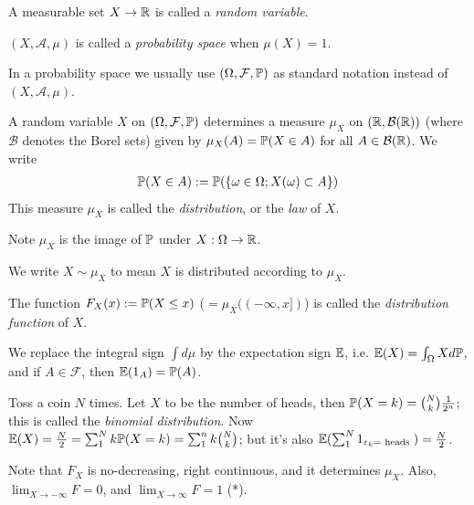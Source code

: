 \documentclass[a4paper]{article}
\begin{document}
\begin{defi}
A measurable set $X \to \R$ is called a \emph{random variable}.
\end{defi}

\begin{defi}
$(X,\mathcal{A},\mu)$ is called a \emph{probability space} when $\mu(X) = 1$.

In a probability space we usually use $(\Omega,\mathcal{F},\P)$ as standard notation instead of $(X,\mathcal{A},\mu)$.
\end{defi}

\begin{defi}
A random variable $X$ on $(\Omega,\mathcal{F},\P)$ determines a measure $\mu_X$ on $(\R,\mathcal{B}(\R))$ (where $\mathcal{B}$ denotes the Borel sets) given by $\mu_X(A) = \P(X \in A)$ for all $A \in \mathcal{B}(\R)$. We write
\begin{equation*}
\begin{aligned}
\P(X \in A): = \P(\{\omega \in \Omega; X(\omega) \subset A\})
\end{aligned}
\end{equation*}
This measure $\mu_X$ is called the \emph{distribution}, or the \emph{law} of $X$.

Note $\mu_X$ is the image of $\P$ under $X: \Omega \to \R$.
\end{defi}

We write $X \sim \mu_X$ to mean $X$ is distributed according to $\mu_X$.

\begin{defi}
The function $F_X(x) := \P(X \leq x)$ ($ = \mu_X((-\infty,x])$) is called the \emph{distribution function} of $X$.
\end{defi}

We replace the integral sign $\int d\mu$ by the expectation sign $\E$, i.e. $\E(X) = \int_\Omega X d\P$, and if $A \in \mathcal{F}$, then $\E(1_A) = \P(A)$.

\begin{eg}
Toss a coin $N$ times. Let $X$ to be the number of heads, then $\P(X=k) = {N \choose k} \frac{1}{2^n}$; this is called the \emph{binomial distribution}. Now $\E(X) = \frac{N}{2} = \sum_1^N k\P(X=k) = \sum_1^n k{N \choose k}$; but it's also $\E(\sum_1^N 1_{\varepsilon_k = \text{ heads }}) = \frac{N}{2}$.
\end{eg}

Note that $F_X$ is no-decreasing, right continuous, and it determines $\mu_X$. Also, $\lim_{X \to -\infty} F = 0$, and $\lim_{X \to \infty} F = 1$ (*).
\end{document}
